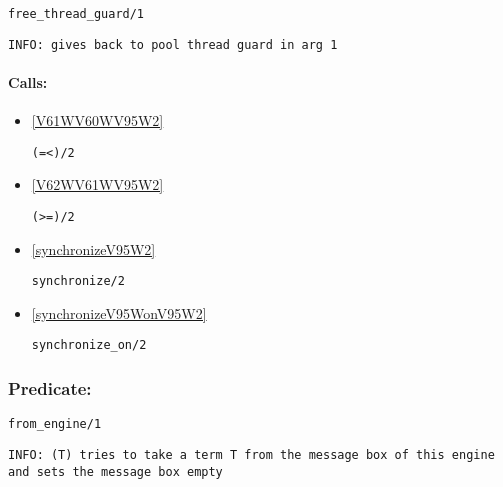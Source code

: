 \begin{verbatim}
free_thread_guard/1
\end{verbatim}

{\small \begin{verbatim}
INFO: gives back to pool thread guard in arg 1

\end{verbatim}}
\paragraph{Calls:} 
\begin{itemize}
\item \ref{V61WV60WV95W2} 
\begin{verbatim}
(=<)/2
\end{verbatim}

\item \ref{V62WV61WV95W2} 
\begin{verbatim}
(>=)/2
\end{verbatim}

\item \ref{synchronizeV95W2} 
\begin{verbatim}
synchronize/2
\end{verbatim}

\item \ref{synchronizeV95WonV95W2} 
\begin{verbatim}
synchronize_on/2
\end{verbatim}

\end{itemize}

\subsubsection{Predicate:} \label{fromV95WengineV95W1}

\begin{verbatim}
from_engine/1
\end{verbatim}

{\small \begin{verbatim}
INFO: (T) tries to take a term T from the message box of this engine and sets the message box empty

\end{verbatim}}
